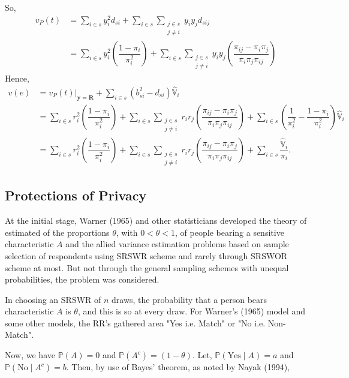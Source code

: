 \documentclass[12pt]{article}
\newcommand{\prob}{\mathbb{P}}
\newcommand{\Var}{\mathbb{V}}
\theoremstyle{definition}
\begin{document}
So, 
\begin{align*}
    v_P(t) & =\sum_{i \in s} y_i^2d_{si} +\displaystyle \sum_{i \in s}\sum_{\substack{j\in s \\ j\neq i}}
    y_iy_jd_{sij}\\
    & = \sum_{i \in s} y_i^2 \left(\dfrac{1-\pi_i}{\pi_i^2}\right) + \sum_{i \in s}\sum_{\substack{j\in s \\ j\neq i}} y_iy_j\left(\dfrac{\pi_{ij}-\pi_i\pi_j}{\pi_i\pi_j\pi_{ij}}\right)
\end{align*}
Hence,
\begin{align*}
    v(e) & = \left.v_P(t)\right|_{\mathbf{y}=\mathbf{R}}+\sum_{i\in s} (b_{si}^2-d_{si})\hat{\Var}_i \\
    & = \sum_{i \in s} r_i^2 \left(\dfrac{1-\pi_i}{\pi_i^2}\right) + \sum_{i \in s}\sum_{\substack{j\in s \\ j\neq i}} r_ir_j\left(\dfrac{\pi_{ij}-\pi_i\pi_j}{\pi_i\pi_j\pi_{ij}}\right) + \sum_{i\in s} \left(\dfrac{1}{\pi_i^2}-\dfrac{1-\pi_i}{\pi_i^2}\right)\hat{\Var}_i \\
    & = \sum_{i \in s} r_i^2 \left(\dfrac{1-\pi_i}{\pi_i^2}\right) + \sum_{i \in s}\sum_{\substack{j\in s \\ j\neq i}} r_ir_j\left(\dfrac{\pi_{ij}-\pi_i\pi_j}{\pi_i\pi_j\pi_{ij}}\right) + \sum_{i\in s} \dfrac{\hat{\Var}_i}{\pi_i}.
\end{align*}



\subsection{Protections of Privacy}

At the initial stage, Warner (1965) and other statisticians developed the theory of estimated of the proportions $\theta$, with $0 < \theta < 1$, of people bearing a sensitive characteristic $A$ and the allied variance estimation problems based on sample selection of respondents using SRSWR scheme and rarely through SRSWOR scheme at most. But not through the general sampling schemes with unequal probabilities, the problem was considered.

In choosing an SRSWR of $n$ draws, the probability that a person bears characteristic $A$ is $\theta$, and this is so at every draw. For Warner's (1965) model and some other models, the RR's gathered area "Yes i.e. Match" or "No i.e. Non-Match". 

Now, we have $\prob(A) = 0$ and $\prob(A^c) = (1-\theta)$. Let, $\prob(\text{Yes} \mid A) = a$ and $\prob(\text{No} \mid A^c) = b$. Then, by use of Bayes' theorem, as noted by Nayak (1994),
\end{document}
